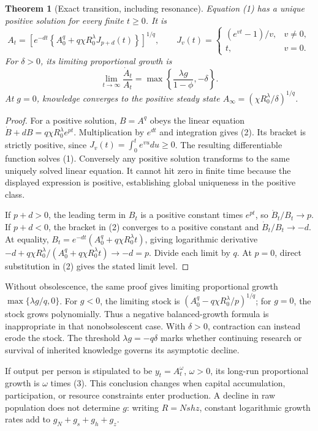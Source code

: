 \documentclass[11pt]{article}
\newtheorem{theorem}{Theorem}
\theoremstyle{definition}
\begin{document}
\begin{theorem}[Exact transition, including resonance]
Equation (1) has a unique positive solution for every finite $t\ge0$. It is
\[
 A_t=\left[e^{-dt}\left\{A_0^q+q\chi R_0^\lambda J_{p+d}(t)\right\}\right]^{1/q},
 \qquad
 J_v(t)=\begin{cases}(e^{vt}-1)/v,&v\ne0,\\t,&v=0.\end{cases}
 \tag{2}
\]
For $\delta>0$, its limiting proportional growth is
\[
 \lim_{t\to\infty}\frac{\dot A_t}{A_t}
 =\max\left\{\frac{\lambda g}{1-\phi},-\delta\right\}.
 \tag{3}
\]
At $g=0$, knowledge converges to the positive steady state
$A_\infty=(\chi R_0^\lambda/\delta)^{1/q}$.
\end{theorem}
\begin{proof}
For a positive solution, $B=A^q$ obeys the linear equation
$\dot B+dB=q\chi R_0^\lambda e^{pt}$. Multiplication by $e^{dt}$ and integration gives (2). Its bracket is strictly positive, since $J_v(t)=\int_0^te^{vu}du\ge0$. The resulting differentiable function solves (1). Conversely any positive solution transforms to the same uniquely solved linear equation. It cannot hit zero in finite time because the displayed expression is positive, establishing global uniqueness in the positive class.

If $p+d>0$, the leading term in $B_t$ is a positive constant times $e^{pt}$, so $\dot B_t/B_t\to p$. If $p+d<0$, the bracket in (2) converges to a positive constant and $\dot B_t/B_t\to-d$. At equality, $B_t=e^{-dt}(A_0^q+q\chi R_0^\lambda t)$, giving logarithmic derivative $-d+q\chi R_0^\lambda/(A_0^q+q\chi R_0^\lambda t)\to-d=p$. Divide each limit by $q$. At $p=0$, direct substitution in (2) gives the stated limit level.
\end{proof}

Without obsolescence, the same proof gives limiting proportional growth $\max\{\lambda g/q,0\}$. For $g<0$, the limiting stock is $(A_0^q-q\chi R_0^\lambda/p)^{1/q}$; for $g=0$, the stock grows polynomially. Thus a negative balanced-growth formula is inappropriate in that nonobsolescent case. With $\delta>0$, contraction can instead erode the stock. The threshold $\lambda g=-q\delta$ marks whether continuing research or survival of inherited knowledge governs its asymptotic decline.

If output per person is stipulated to be $y_t=A_t^\omega$, $\omega>0$, its long-run proportional growth is $\omega$ times (3). This conclusion changes when capital accumulation, participation, or resource constraints enter production. A decline in raw population does not determine $g$: writing $R=Nshz$, constant logarithmic growth rates add to $g_N+g_s+g_h+g_z$.
\end{document}

